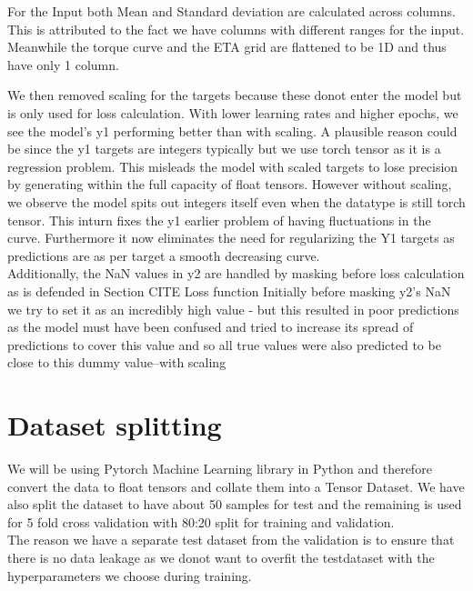 \documentclass{report} %
\begin{document}
\vspace{0.2cm} %

For the Input both Mean and Standard deviation are calculated across columns. This is attributed to the fact we have columns with different ranges for the input. 
Meanwhile the torque curve and the ETA grid are flattened to be 1D and thus have only 1 column.

We then removed scaling for the targets because these donot enter the model but is only used for loss calculation.
With lower learning rates and higher epochs, we see the model's y1 performing better than with scaling.
A plausible reason could be since the y1 targets are integers typically but we use torch tensor as it is a regression problem. This misleads the model with scaled targets to lose precision by generating within the full capacity of float tensors.
However without scaling, we observe the model spits out integers itself even when the datatype is still torch tensor. This inturn fixes the y1 earlier problem of having fluctuations in the curve.
Furthermore it now eliminates the need for regularizing the Y1 targets as predictions are as per target a smooth decreasing curve.\\

Additionally, the \ac{NaN} values in y2 are handled by masking before loss calculation as is defended in Section CITE Loss function
Initially before masking y2's \ac{NaN} we try to set it as an incredibly high value - but this resulted in poor predictions as the model must have been confused and tried to increase its spread of predictions to cover this value and so all true values were also predicted to be close to this dummy value--with scaling

\section{Dataset splitting}\label{sec:Dataset splitting}

We will be using Pytorch Machine Learning library in Python and therefore convert the data to float tensors and collate them into a Tensor Dataset.
We have also split the dataset to have about 50 samples for test and the remaining is used for 5 fold cross validation with 80:20 split for training and validation. \\
The reason we have a separate test dataset from the validation is to ensure that there is no data leakage as we donot want to overfit the testdataset with the hyperparameters we choose during training. \\
\end{document}
